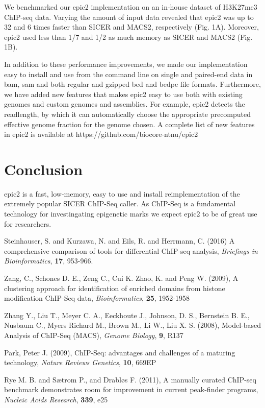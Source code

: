 \documentclass{bioinfo}
\begin{document}
We benchmarked our epic2 implementation on an in-house dataset of H3K27me3
ChIP-seq data. Varying the amount of input data revealed that epic2 was up to
32 and 6 times faster than SICER and MACS2, respectively (Fig. 1A). Moreover,
epic2 used less than 1/7 and 1/2 as much memory as SICER and MACS2 (Fig. 1B).

In addition to these performance improvements, we made our implementation easy
to install and use from the command line on single and paired-end data in bam,
sam and both regular and gzipped bed and bedpe file formats. Furthermore, we
have added new features that makes epic2 easy to use both with existing genomes
and custom genomes and assemblies. For example, epic2 detects the readlength, by
which it can automatically choose the appropriate precomputed effective genome
fraction for the genome chosen. A complete list of new features in epic2 is
available at https://github.com/biocore-ntnu/epic2


\section{Conclusion}

epic2 is a fast, low-memory, easy to use and install reimplementation of the
extremely popular SICER ChIP-Seq caller. As ChIP-Seq is a fundamental technology
for investingating epigenetic marks we expect epic2 to be of great use for
researchers.

\begin{thebibliography}{}

Steinhauser, S. and Kurzawa, N. and Eils, R. and Herrmann, C. (2016) A comprehensive comparison of tools for differential ChIP-seq analysis, {\it Briefings in Bioinformatics}, {\bf 17}, 953-966.

Zang, C., Schones D. E., Zeng C., Cui K. Zhao, K. and Peng W. (2009), A
clustering approach for identification of enriched domains from histone
modification ChIP-Seq data, {\it Bioinformatics}, {\bf 25}, 1952-1958

Zhang Y., Liu T., Meyer C. A., Eeckhoute J., Johnson, D. S., Bernstein B. E., Nusbaum C., Myers Richard M., Brown M., Li W., Liu X. S.
(2008), Model-based Analysis of ChIP-Seq (MACS), {\it Genome Biology}, {\bf 9}, R137

Park, Peter J. (2009), ChIP-Seq: advantages and challenges of a maturing
technology, {\it Nature Reviews Genetics}, {\bf 10}, 669EP

Rye M. B. and Sætrom P., and Drabløs F. (2011), A manually curated ChIP-seq benchmark demonstrates room for improvement in current peak-finder programs,
{\it Nucleic Acids Research}, {\bf 339}, e25

\end{thebibliography}
\end{document}
